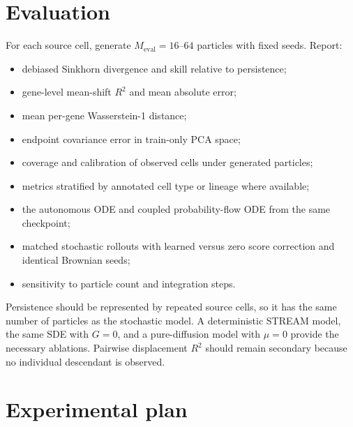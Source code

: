 \documentclass[11pt]{article}
\newcommand{\stream}{STREAM}
\begin{document}
\section{Evaluation}

For each source cell, generate $M_{\mathrm{eval}}=16$--$64$ particles with
fixed seeds. Report:
\begin{itemize}
  \item debiased Sinkhorn divergence and skill relative to persistence;
  \item gene-level mean-shift $R^2$ and mean absolute error;
  \item mean per-gene Wasserstein-1 distance;
  \item endpoint covariance error in train-only PCA space;
  \item coverage and calibration of observed cells under generated particles;
  \item metrics stratified by annotated cell type or lineage where available;
  \item the autonomous ODE and coupled probability-flow ODE from the same
        checkpoint;
  \item matched stochastic rollouts with learned versus zero score correction
        and identical Brownian seeds;
  \item sensitivity to particle count and integration steps.
\end{itemize}

Persistence should be represented by repeated source cells, so it has the same
number of particles as the stochastic model. A deterministic \stream{} model,
the same SDE with $G=0$, and a pure-diffusion model with $\mu=0$ provide the
necessary ablations. Pairwise displacement $R^2$ should remain secondary
because no individual descendant is observed.

\section{Experimental plan}
\end{document}
